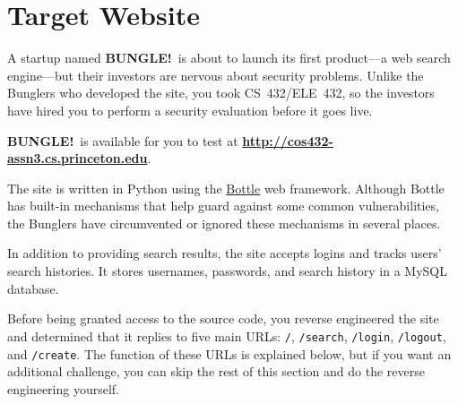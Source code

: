 \documentclass[letterpaper,12pt]{report}
\newcommand{\bungledomain}{http://cos432-assn3.cs.princeton.edu}
\begin{document}


\section*{Target Website}
\newcommand{\note}[1]{\textsl{#1}}
\newcommand\bungle{\textsf{\bfseries{B{\scriptsize UNGLE}!}}}

A startup named \bungle\ is about to launch its first product---a web search engine---but their investors are nervous about security problems.  Unlike the Bunglers who developed the site, you took CS~432/ELE~432, so the investors have hired you to perform a security evaluation before it goes live.

\medskip

\bungle\ is available for you to test at \textbf{\url{\bungledomain}}.

\medskip

The site is written in Python using the \href{http://bottlepy.org/docs/dev/index.html}{Bottle} web framework. Although Bottle has built-in mechanisms that help guard against some common vulnerabilities, the Bunglers have circumvented or ignored these mechanisms in several places.

\medskip

In addition to providing search results, the site accepts logins and tracks users' search histories. It stores usernames, passwords, and search history in a MySQL database.

\medskip

Before being granted access to the source code, you reverse engineered the site and determined that it replies to five main URLs: \texttt{/}, \texttt{/search}, \texttt{/login}, \texttt{/logout}, and \texttt{/create}.  The function of these URLs is explained below, but if you want an additional challenge, you can skip the rest of this section and do the reverse engineering yourself.
\end{document}
